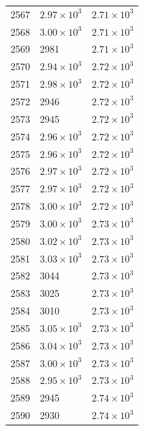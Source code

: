 \begin{table}[H]
\begin{tabular}{lll}
2567 & $\displaystyle 2.97 \times 10^{3}$ & $\displaystyle 2.71 \times 10^{3}$ \\
2568 & $\displaystyle 3.00 \times 10^{3}$ & $\displaystyle 2.71 \times 10^{3}$ \\
2569 & 2981 & $\displaystyle 2.71 \times 10^{3}$ \\
2570 & $\displaystyle 2.94 \times 10^{3}$ & $\displaystyle 2.72 \times 10^{3}$ \\
2571 & $\displaystyle 2.98 \times 10^{3}$ & $\displaystyle 2.72 \times 10^{3}$ \\
2572 & 2946 & $\displaystyle 2.72 \times 10^{3}$ \\
2573 & 2945 & $\displaystyle 2.72 \times 10^{3}$ \\
2574 & $\displaystyle 2.96 \times 10^{3}$ & $\displaystyle 2.72 \times 10^{3}$ \\
2575 & $\displaystyle 2.96 \times 10^{3}$ & $\displaystyle 2.72 \times 10^{3}$ \\
2576 & $\displaystyle 2.97 \times 10^{3}$ & $\displaystyle 2.72 \times 10^{3}$ \\
2577 & $\displaystyle 2.97 \times 10^{3}$ & $\displaystyle 2.72 \times 10^{3}$ \\
2578 & $\displaystyle 3.00 \times 10^{3}$ & $\displaystyle 2.72 \times 10^{3}$ \\
2579 & $\displaystyle 3.00 \times 10^{3}$ & $\displaystyle 2.73 \times 10^{3}$ \\
2580 & $\displaystyle 3.02 \times 10^{3}$ & $\displaystyle 2.73 \times 10^{3}$ \\
2581 & $\displaystyle 3.03 \times 10^{3}$ & $\displaystyle 2.73 \times 10^{3}$ \\
2582 & 3044 & $\displaystyle 2.73 \times 10^{3}$ \\
2583 & 3025 & $\displaystyle 2.73 \times 10^{3}$ \\
2584 & 3010 & $\displaystyle 2.73 \times 10^{3}$ \\
2585 & $\displaystyle 3.05 \times 10^{3}$ & $\displaystyle 2.73 \times 10^{3}$ \\
2586 & $\displaystyle 3.04 \times 10^{3}$ & $\displaystyle 2.73 \times 10^{3}$ \\
2587 & $\displaystyle 3.00 \times 10^{3}$ & $\displaystyle 2.73 \times 10^{3}$ \\
2588 & $\displaystyle 2.95 \times 10^{3}$ & $\displaystyle 2.73 \times 10^{3}$ \\
2589 & 2945 & $\displaystyle 2.74 \times 10^{3}$ \\
2590 & 2930 & $\displaystyle 2.74 \times 10^{3}$ \\

\end{tabular}
\end{table}
